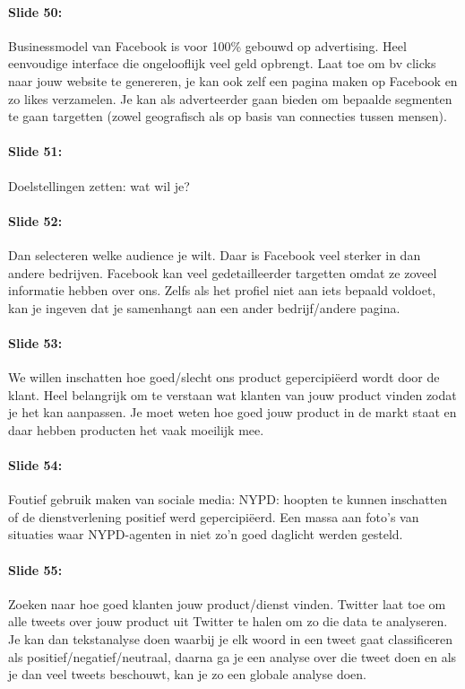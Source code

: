 \documentclass[10pt,a4paper]{report}
\begin{document}
\paragraph{Slide 50:}Businessmodel van Facebook is voor 100\% gebouwd op advertising. Heel eenvoudige interface die ongelooflijk veel geld opbrengt. Laat toe om bv clicks naar jouw website te genereren, je kan ook zelf een pagina maken op Facebook en zo likes verzamelen. Je kan als adverteerder gaan bieden om bepaalde segmenten te gaan targetten (zowel geografisch als op basis van connecties tussen mensen).

\paragraph{Slide 51:}Doelstellingen zetten: wat wil je?

\paragraph{Slide 52:}Dan selecteren welke audience je wilt. Daar is Facebook veel sterker in dan andere bedrijven. Facebook kan veel gedetailleerder targetten omdat ze zoveel informatie hebben over ons. Zelfs als het profiel niet aan iets bepaald voldoet, kan je ingeven dat je samenhangt aan een ander bedrijf/andere pagina.

\paragraph{Slide 53:}We willen inschatten hoe goed/slecht ons product gepercipiëerd wordt door de klant. Heel belangrijk om te verstaan wat klanten van jouw product vinden zodat je het kan aanpassen. Je moet weten hoe goed jouw product in de markt staat en daar hebben producten het vaak moeilijk mee.

\paragraph{Slide 54:}Foutief gebruik maken van sociale media: NYPD: hoopten te kunnen inschatten of de dienstverlening positief werd gepercipiëerd. Een massa aan foto's van situaties waar NYPD-agenten in niet zo'n goed daglicht werden gesteld. 

\paragraph{Slide 55:}Zoeken naar hoe goed klanten jouw product/dienst vinden. Twitter laat toe om alle tweets over jouw product uit Twitter te halen om zo die data te analyseren. Je kan dan tekstanalyse doen waarbij je elk woord in een tweet gaat classificeren als positief/negatief/neutraal, daarna ga je een analyse over die tweet doen en als je dan veel tweets beschouwt, kan je zo een globale analyse doen.
\end{document}
